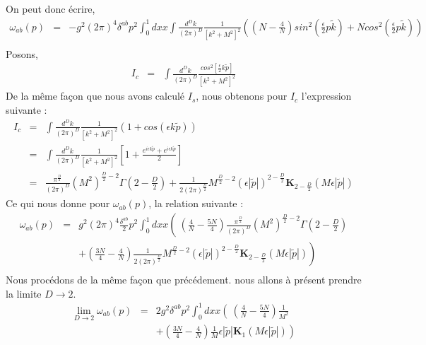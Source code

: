 \documentclass[a4paper,11pt]{article} %
\theoremstyle{plain}
\theoremstyle{definition}
\theoremstyle{remark}
\numberwithin{equation}{section}
\numberwithin{equation}{subsection}
\numberwithin{figure}{section}
\begin{document}
\noindent
On peut donc écrire,
 \begin{eqnarray*}
  \omega_{ab}(p) &=& - g^{2}  (2 \pi)^{4} \delta^{ab}  p^{2}
\int_{0}^{1}  dx  x
\int  \frac{d^D k}{(2 \pi)^D}
\frac{1}{ [k^2 + M^2 ]^2}
\left(
\left( N-\frac{4}{N} \right)  sin^{2} \left(  \frac{\epsilon}{2}  p \tilde{k}   \right)
+ N cos^{2} \left(  \frac{\epsilon}{2}  p \tilde{k}   \right)
\right)  \\
\end{eqnarray*}
Posons,
\begin{eqnarray*}
 I_{c} &=& \int  \frac{d^D k}{(2 \pi)^D}
\frac{cos^2 \left[ \frac{\epsilon}{2} k \tilde{p} \right] }{\left[ k^2  +  M^2  \right]^2}
\end{eqnarray*}
De la même façon que nous avons calculé $I_{s}$, nous obtenons pour $I_{c}$ l'expression suivante :
\begin{eqnarray*}
 I_{c} &=& \int  \frac{d^D k}{(2 \pi)^D}
\frac{1}{\left[ k^2  +  M^2 \right]^2} 
 \left( 1 + cos ( \epsilon k \tilde{p} ) \right) \\
          &=&  \int  \frac{d^D k}{(2 \pi)^D}
\frac{1 }{\left[ k^2  +  M^2 \right]^2} 
 \left[ 1 + \frac{e^{ i \epsilon k \tilde{p} }   +   e^{i \epsilon k \tilde{p} } }{ 2 }  \right] \\
          &=& \frac{ \pi^{\frac{D}{2}} }{ (2 \pi)^{D}  }  (M^2)^{\frac{D}{2}-2} \Gamma(2-\frac{D}{2})
+  \frac{1}{2 (2 \pi )^{\frac{D}{2}}}  M^{\frac{D}{2} - 2}  \left( \epsilon \left| \tilde{p}  \right|  \right)^{ 2-\frac{D}{2} }   \textbf{K}_{2- \frac{D}{2}  } ( M \epsilon  \left| \tilde{p}  \right|  )
\end{eqnarray*}
Ce qui nous donne pour $  \omega_{ab}(p)$, la relation suivante :
\begin{eqnarray*}
 \omega_{ab}(p) &=&  g^{2}  (2 \pi)^{4}  \frac{\delta^{ab}}{2} p^2
\int_{0}^{1}  dx x
\left( \
\left( \frac{4}{N}  -  \frac{5N}{4}  \right)   \frac{ \pi^{\frac{D}{2}} }{ (2 \pi)^{D}  }  (M^2)^{\frac{D}{2}-2} 
\Gamma(2-\frac{D}{2})  \right. \nonumber \\
&&  \left.   + \left( \frac{3N}{4}  - \frac{4}{N}   \right) \frac{1}{2 (2 \pi )^{ \frac{D}{2}}}  M^{\frac{D}{2} - 2} 
\left( \epsilon  \left| \tilde{p}  \right| \right)^{ 2-\frac{D}{2} }   \textbf{K}_{2- \frac{D}{2}  } ( M \epsilon  \left| \tilde{p}  \right|  )
 \right)  \\
 \end{eqnarray*}
Nous procédons de la même façon que précédement. nous allons à présent prendre la limite $D \to 2$.
 \begin{eqnarray*}
  \lim\limits_{D \to 2} \omega_{ab}(p) &=& 2 g^{2}  \delta^{ab} p^2
\int_{0}^{1}  dx x
\left( \
\left( \frac{4}{N}  -  \frac{5N}{4}  \right)  \frac{1}{M^2}  \right. \\
&&  \left.   + \left( \frac{3N}{4}  - \frac{4}{N}   \right)  \frac{1}{M}  \epsilon \left| \tilde{p}  \right|   \textbf{K}_{1 } ( M \epsilon \left| \tilde{p}  \right|  )
 \right)  \\
 \end{eqnarray*}
\end{document}
